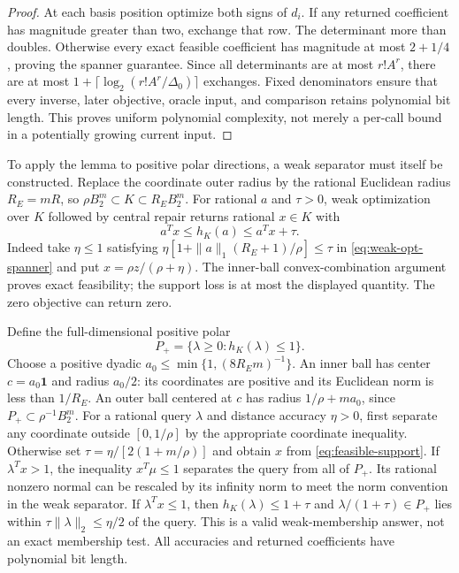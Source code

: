 \begin{proof}
At each basis position optimize both signs of $d_i$. If any returned
coefficient has magnitude greater than two, exchange that row. The
determinant more than doubles. Otherwise every exact feasible coefficient
has magnitude at most $2+1/4$, proving the spanner guarantee.
Since all determinants are at most $r!A^r$, there are at most
$1+\lceil\log_2(r!A^r/\Delta_0)\rceil$ exchanges. Fixed denominators
ensure that every inverse, later objective, oracle input, and comparison
retains polynomial bit length. This proves uniform polynomial complexity,
not merely a per-call bound in a potentially growing current input.
\end{proof}

To apply the lemma to positive polar directions, a weak separator must
itself be constructed. Replace the coordinate outer radius by the rational
Euclidean radius $R_E=mR$, so
$\rho B_2^m\subset K\subset R_EB_2^m$.
For rational $a$ and $\tau>0$, weak optimization over $K$ followed by
central repair returns rational $x\in K$ with
\begin{equation}\label{eq:feasible-support}
 a^Tx\le h_K(a)\le a^Tx+\tau.
\end{equation}
Indeed take $\eta\le1$ satisfying
$\eta[1+\|a\|_1(R_E+1)/\rho]\le\tau$ in
\eqref{eq:weak-opt-spanner} and put $x=\rho z/(\rho+\eta)$.
The inner-ball convex-combination argument proves exact feasibility;
the support loss is at most the displayed quantity. The zero objective
can return zero.

Define the full-dimensional positive polar
\[
 P_+=\{\lambda\ge0:h_K(\lambda)\le1\}.
\]
Choose a positive dyadic $a_0\le\min\{1,(8R_Em)^{-1}\}$.
An inner ball has center $c=a_0\mathbf1$ and radius $a_0/2$:
its coordinates are positive and its Euclidean norm is less than
$1/R_E$. An outer ball centered at $c$ has radius
$1/\rho+ma_0$, since $P_+\subset\rho^{-1}B_2^m$.
For a rational query $\lambda$ and distance accuracy $\eta>0$, first
separate any coordinate outside $[0,1/\rho]$ by the appropriate
coordinate inequality. Otherwise set
$\tau=\eta/[2(1+m/\rho)]$ and obtain $x$ from
\eqref{eq:feasible-support}. If $\lambda^Tx>1$, the inequality
$x^T\mu\le1$ separates the query from all of $P_+$.
Its rational nonzero normal can be rescaled by its infinity norm to
meet the norm convention in the weak separator. If
$\lambda^Tx\le1$, then $h_K(\lambda)\le1+\tau$ and
$\lambda/(1+\tau)\in P_+$ lies within
$\tau\|\lambda\|_2\le\eta/2$ of the query.
This is a valid weak-membership answer, not an exact membership test.
All accuracies and returned coefficients have polynomial bit length.

